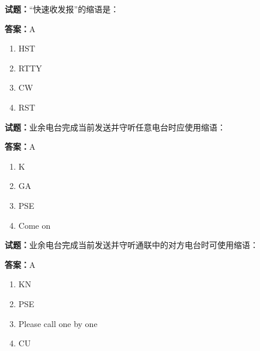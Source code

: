 \documentclass{ctexbook}
\begin{document}




\vspace{1em}

\textbf{试题：}“快速收发报”的缩语是： 

\textbf{答案：}A 

\begin{enumerate}[leftmargin=3em]
  \item HST 

  \item RTTY 

  \item CW 

  \item RST 

\end{enumerate}





\vspace{1em}

\textbf{试题：}业余电台完成当前发送并守听任意电台时应使用缩语： 


\textbf{答案：}A 

\begin{enumerate}[leftmargin=3em]
  \item K 

  \item GA 

  \item PSE 

  \item Come on 

\end{enumerate}





\vspace{1em}

\textbf{试题：}业余电台完成当前发送并守听通联中的对方电台时可使用缩语： 

\textbf{答案：}A 

\begin{enumerate}[leftmargin=3em]
  \item KN 

  \item PSE 

  \item Please call one by one 

  \item CU 

\end{enumerate}
\end{document}
